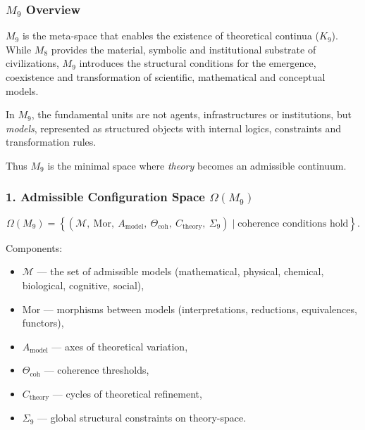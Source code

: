 

\subsubsection{\texorpdfstring{$M_9$}{M_9} Overview}
\label{sec:m9-overview}

$M_9$ is the meta-space that enables the existence of 
theoretical continua ($K_9$). 
While $M_8$ provides the material, symbolic and institutional 
substrate of civilizations, $M_9$ introduces the structural conditions 
for the emergence, coexistence and transformation of 
scientific, mathematical and conceptual models.

In $M_9$, the fundamental units are not agents, infrastructures or
institutions, but \emph{models}, represented as structured objects 
with internal logics, constraints and transformation rules.  

Thus $M_9$ is the minimal space where \emph{theory} becomes an admissible continuum.

\subsubsection*{1. Admissible Configuration Space \texorpdfstring{$\Omega(M_9)$}{\Omega(M_9)}}

\[
\Omega(M_9)=
\left\{
(\mathcal{M},\ \mathrm{Mor},\ A_{\mathrm{model}},\ 
\Theta_{\mathrm{coh}},\ C_{\mathrm{theory}},\ \Sigma_9)
\mid \text{coherence conditions hold}
\right\}.
\]

Components:

\begin{itemize}
    \item $\mathcal{M}$ — the set of admissible models 
        (mathematical, physical, chemical, biological, cognitive, social),
    \item $\mathrm{Mor}$ — morphisms between models 
        (interpretations, reductions, equivalences, functors),
    \item $A_{\mathrm{model}}$ — axes of theoretical variation,
    \item $\Theta_{\mathrm{coh}}$ — coherence thresholds,
    \item $C_{\mathrm{theory}}$ — cycles of theoretical refinement,
    \item $\Sigma_9$ — global structural constraints on theory-space.
\end{itemize}

